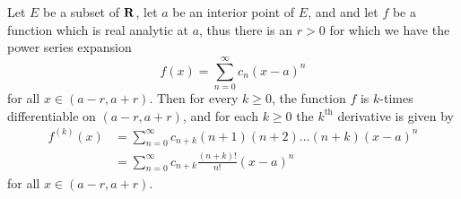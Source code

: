 \setcounter{theorem}{5}
\begin{proposition}\label{4.2.6}
    Let \(E\) be a subset of \(\mathbf{R}\), let \(a\) be an interior point of \(E\), and and let \(f\) be a function which is real analytic at \(a\), thus there is an \(r > 0\) for which we have the power series expansion
    \[
        f(x) = \sum_{n = 0}^\infty c_n (x - a)^n
    \]
    for all \(x \in (a - r, a + r)\).
    Then for every \(k \geq 0\), the function \(f\) is \(k\)-times differentiable on \((a - r, a + r)\), and for each \(k \geq 0\) the \(k^{\text{th}}\) derivative is given by
    \begin{align*}
        f^{(k)}(x) & = \sum_{n = 0}^\infty c_{n + k} (n + 1) (n + 2) \dots (n + k) (x - a)^n \\
                   & = \sum_{n = 0}^\infty c_{n + k} \frac{(n + k)!}{n!} (x - a)^n
    \end{align*}
    for all \(x \in (a - r, a + r)\).
\end{proposition}

